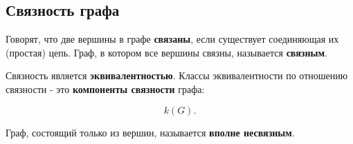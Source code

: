 {\subsection*{Связность графа}

Говорят, что две вершины в графе \textbf{связаны}, если существует соединяющая их (простая) цепь. Граф, в котором все вершины связны, называется \textbf{связным}.

Связность является \textbf{эквивалентностью}. Классы эквивалентности по отношению связности - это \textbf{компоненты связности} графа:


\[
k(G).
\]



Граф, состоящий только из вершин, называется \textbf{вполне несвязным}.


	\newpage
}
